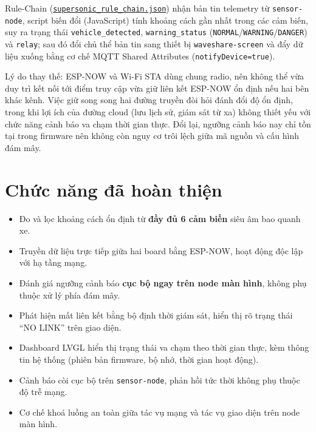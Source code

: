 \documentclass[a4paper,12pt]{article}
\newcommand{\code}[1]{\texttt{#1}}
\begin{document}
\begin{sloppypar}
Rule-Chain (\href{https://github.com/YdtTran/supersonic-warning-system/blob/main/cloud/coreiot/rule_chain/supersonic_rule_chain.json}{\code{supersonic\_rule\_chain.json}}) nhận bản tin telemetry từ \code{sensor-node}, script biến đổi (JavaScript) tính khoảng cách gần nhất trong các cảm biến, suy ra trạng thái \code{vehicle\_detected}, \code{warning\_status} (\code{NORMAL}/\code{WARNING}/\code{DANGER}) và \code{relay}; sau đó đổi chủ thể bản tin sang thiết bị \code{waveshare-screen} và đẩy dữ liệu xuống bằng cơ chế MQTT Shared Attributes (\code{notifyDevice=true}).
\end{sloppypar}

Lý do thay thế: ESP-NOW và Wi-Fi STA dùng chung radio, nên không thể vừa duy trì kết nối tới điểm truy cập vừa giữ liên kết ESP-NOW ổn định nếu hai bên khác kênh. Việc giữ song song hai đường truyền đòi hỏi đánh đổi độ ổn định, trong khi lợi ích của đường cloud (lưu lịch sử, giám sát từ xa) không thiết yếu với chức năng cảnh báo va chạm thời gian thực. Đổi lại, ngưỡng cảnh báo nay chỉ tồn tại trong firmware nên không còn nguy cơ trôi lệch giữa mã nguồn và cấu hình đám mây.

\section{Chức năng đã hoàn thiện}

\begin{itemize}[nosep]
    \item Đo và lọc khoảng cách ổn định từ \textbf{đầy đủ 6 cảm biến} siêu âm bao quanh xe.
    \item Truyền dữ liệu trực tiếp giữa hai board bằng ESP-NOW, hoạt động độc lập với hạ tầng mạng.
    \item Đánh giá ngưỡng cảnh báo \textbf{cục bộ ngay trên node màn hình}, không phụ thuộc xử lý phía đám mây.
    \item Phát hiện mất liên kết bằng bộ định thời giám sát, hiển thị rõ trạng thái ``NO LINK'' trên giao diện.
    \item Dashboard LVGL hiển thị trạng thái va chạm theo thời gian thực, kèm thông tin hệ thống (phiên bản firmware, bộ nhớ, thời gian hoạt động).
    \item Cảnh báo còi cục bộ trên \code{sensor-node}, phản hồi tức thời không phụ thuộc độ trễ mạng.
    \item Cơ chế khoá luồng an toàn giữa tác vụ mạng và tác vụ giao diện trên node màn hình.
\end{itemize}
\end{document}

